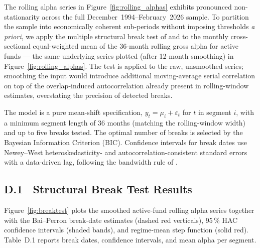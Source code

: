 \documentclass[12pt]{article}
\begin{document}
The rolling alpha series in Figure~\ref{fig:rolling_alphas} exhibits pronounced
non-stationarity across the full December~1994--February~2026 sample. To
partition the sample into
economically coherent sub-periods without imposing thresholds \textit{a priori},
we apply the multiple structural break test of \textcite{Bai1998} and
\textcite{Bai2003} to the monthly cross-sectional equal-weighted mean of the
36-month rolling \textcite{Carhart1997} gross alpha for active funds --- the same
underlying series plotted (after 12-month smoothing) in
Figure~\ref{fig:rolling_alphas}. The test is applied to the raw, unsmoothed
series; smoothing the input would introduce additional moving-average serial
correlation on top of the overlap-induced autocorrelation already present in
rolling-window estimates, overstating the precision of detected breaks.

The model is a pure mean-shift specification, $y_t = \mu_i + \varepsilon_t$
for $t$ in segment $i$, with a minimum segment length of 36 months (matching
the rolling-window width) and up to five breaks tested. The optimal number of
breaks is selected by the Bayesian Information Criterion (BIC). Confidence
intervals for break dates use Newey--West heteroskedasticity- and
autocorrelation-consistent standard errors with a data-driven lag, following
the bandwidth rule of \textcite{Andrews1991}.

\subsection*{D.1 \ Structural Break Test Results}

Figure~\ref{fig:breaktest} plots the smoothed active-fund rolling alpha series
together with the Bai--Perron break-date estimates (dashed red verticals),
95\,\% HAC confidence intervals (shaded bands), and regime-mean step function
(solid red). Table~D.1 reports break dates, confidence intervals, and mean
alpha per segment.
\end{document}
